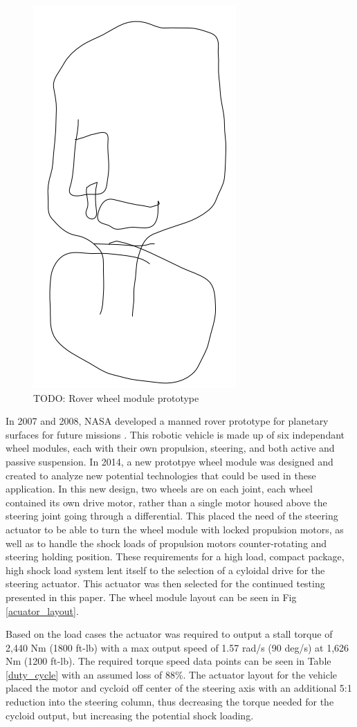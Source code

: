 \documentclass[letterpaper, 10 pt, conference]{ieeeconf}  %
\begin{document}
   \begin{figure}[!b]
      \centering
      \includegraphics[width=0.50\linewidth]{wheel_module_cartoon}
      \caption{TODO: Rover wheel module prototype}
      \label{cycloid_cartoon}
   \end{figure}
In 2007 and 2008, NASA developed a manned rover prototype for planetary surfaces for future missions \cite{rover}. This robotic vehicle is made up of six independant wheel modules, each with their own propulsion, steering, and both active and passive suspension. In 2014, a new prototpye wheel module was designed and created to analyze new potential technologies that could be used in these application. In this new design, two wheels are on each joint, each wheel contained its own drive motor, rather than a single motor housed above the steering joint going through a differential. This placed the need of the steering actuator to be able to turn the wheel module with locked propulsion motors, as well as to handle the shock loads of propulsion motors counter-rotating and steering holding position. These requirements for a high load, compact package, high shock load system lent itself to the selection of a cyloidal drive for the steering actuator. This actuator was then selected for the continued testing presented in this paper. The wheel module layout can be seen in Fig \ref{acuator_layout}.


Based on the load cases the actuator was required to output a stall torque of 2,440 Nm (1800 ft-lb) with a max output speed of 1.57 rad/s (90 deg/s) at 1,626 Nm (1200 ft-lb). The required torque speed data points can be seen in Table \ref{duty_cycle} with an assumed loss of 88\%. The actuator layout for the vehicle placed the motor and cycloid off center of the steering axis with an additional 5:1 reduction into the steering column, thus decreasing the torque needed for the cycloid output, but increasing the potential shock loading. 
\end{document}
